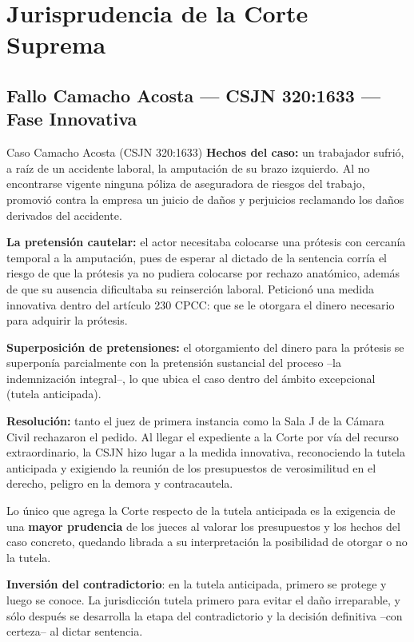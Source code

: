 \documentclass[12pt,oneside]{book}
\begin{document}
\section{Jurisprudencia de la Corte Suprema}

\subsection{Fallo Camacho Acosta --- CSJN 320:1633 --- Fase Innovativa}

\begin{example}{Caso Camacho Acosta (CSJN 320:1633)}
\textbf{Hechos del caso:} un trabajador sufrió, a raíz de un accidente laboral, la amputación de su brazo izquierdo. Al no encontrarse vigente ninguna póliza de aseguradora de riesgos del trabajo, promovió contra la empresa un juicio de daños y perjuicios reclamando los daños derivados del accidente.

\textbf{La pretensión cautelar:} el actor necesitaba colocarse una prótesis con cercanía temporal a la amputación, pues de esperar al dictado de la sentencia corría el riesgo de que la prótesis ya no pudiera colocarse por rechazo anatómico, además de que su ausencia dificultaba su reinserción laboral. Peticionó una medida innovativa dentro del artículo 230 CPCC: que se le otorgara el dinero necesario para adquirir la prótesis.

\textbf{Superposición de pretensiones:} el otorgamiento del dinero para la prótesis se superponía parcialmente con la pretensión sustancial del proceso --la indemnización integral--, lo que ubica el caso dentro del ámbito excepcional (tutela anticipada).

\textbf{Resolución:} tanto el juez de primera instancia como la Sala J de la Cámara Civil rechazaron el pedido. Al llegar el expediente a la Corte por vía del recurso extraordinario, la CSJN hizo lugar a la medida innovativa, reconociendo la tutela anticipada y exigiendo la reunión de los presupuestos de verosimilitud en el derecho, peligro en la demora y contracautela.
\end{example}

Lo único que agrega la Corte respecto de la tutela anticipada es la exigencia de una \textbf{mayor prudencia} de los jueces al valorar los presupuestos y los hechos del caso concreto, quedando librada a su interpretación la posibilidad de otorgar o no la tutela.

\begin{important}
\textbf{Inversión del contradictorio}: en la tutela anticipada, primero se protege y luego se conoce. La jurisdicción tutela primero para evitar el daño irreparable, y sólo después se desarrolla la etapa del contradictorio y la decisión definitiva --con certeza-- al dictar sentencia.
\end{important}
\end{document}

